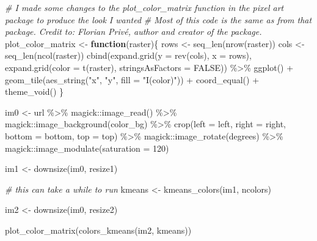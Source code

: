 \documentclass[
  openany]{book}
\newenvironment{Shaded}{\begin{snugshade}}{\end{snugshade}}
\newcommand{\AttributeTok}[1]{\textcolor[rgb]{0.77,0.63,0.00}{#1}}
\newcommand{\CommentTok}[1]{\textcolor[rgb]{0.56,0.35,0.01}{\textit{#1}}}
\newcommand{\ConstantTok}[1]{\textcolor[rgb]{0.00,0.00,0.00}{#1}}
\newcommand{\ControlFlowTok}[1]{\textcolor[rgb]{0.13,0.29,0.53}{\textbf{#1}}}
\newcommand{\DecValTok}[1]{\textcolor[rgb]{0.00,0.00,0.81}{#1}}
\newcommand{\FunctionTok}[1]{\textcolor[rgb]{0.00,0.00,0.00}{#1}}
\newcommand{\NormalTok}[1]{#1}
\newcommand{\OtherTok}[1]{\textcolor[rgb]{0.56,0.35,0.01}{#1}}
\newcommand{\SpecialCharTok}[1]{\textcolor[rgb]{0.00,0.00,0.00}{#1}}
\newcommand{\StringTok}[1]{\textcolor[rgb]{0.31,0.60,0.02}{#1}}
\begin{document}
\begin{Shaded}
\begin{Highlighting}[]
\CommentTok{\# I made some changes to the plot\_color\_matrix function in the pixel art package to produce the look I wanted}
\CommentTok{\# Most of this code is the same as from that package. Credit to: Florian Privé, author and creator of the package. }
\NormalTok{plot\_color\_matrix }\OtherTok{\textless{}{-}} \ControlFlowTok{function}\NormalTok{(raster)\{}
\NormalTok{    rows }\OtherTok{\textless{}{-}} \FunctionTok{seq\_len}\NormalTok{(}\FunctionTok{nrow}\NormalTok{(raster))}
\NormalTok{    cols }\OtherTok{\textless{}{-}} \FunctionTok{seq\_len}\NormalTok{(}\FunctionTok{ncol}\NormalTok{(raster))}
    \FunctionTok{cbind}\NormalTok{(}\FunctionTok{expand.grid}\NormalTok{(}\AttributeTok{y =} \FunctionTok{rev}\NormalTok{(cols), }\AttributeTok{x =}\NormalTok{ rows), }\FunctionTok{expand.grid}\NormalTok{(}\AttributeTok{color =} \FunctionTok{t}\NormalTok{(raster), }
        \AttributeTok{stringsAsFactors =} \ConstantTok{FALSE}\NormalTok{)) }\SpecialCharTok{\%\textgreater{}\%} \FunctionTok{ggplot}\NormalTok{() }\SpecialCharTok{+} \FunctionTok{geom\_tile}\NormalTok{(}\FunctionTok{aes\_string}\NormalTok{(}\StringTok{"x"}\NormalTok{, }
        \StringTok{"y"}\NormalTok{, }\AttributeTok{fill =} \StringTok{"I(color)"}\NormalTok{)) }\SpecialCharTok{+} \FunctionTok{coord\_equal}\NormalTok{() }\SpecialCharTok{+} \FunctionTok{theme\_void}\NormalTok{()}
\NormalTok{\}}

\NormalTok{im0 }\OtherTok{\textless{}{-}}\NormalTok{ url }\SpecialCharTok{\%\textgreater{}\%}\NormalTok{ magick}\SpecialCharTok{::}\FunctionTok{image\_read}\NormalTok{() }\SpecialCharTok{\%\textgreater{}\%}\NormalTok{ magick}\SpecialCharTok{::}\FunctionTok{image\_background}\NormalTok{(color\_bg) }\SpecialCharTok{\%\textgreater{}\%} 
        \FunctionTok{crop}\NormalTok{(}\AttributeTok{left =}\NormalTok{ left, }\AttributeTok{right =}\NormalTok{ right, }\AttributeTok{bottom =}\NormalTok{ bottom, }\AttributeTok{top =}\NormalTok{ top) }\SpecialCharTok{\%\textgreater{}\%} 
\NormalTok{        magick}\SpecialCharTok{::}\FunctionTok{image\_rotate}\NormalTok{(degrees) }\SpecialCharTok{\%\textgreater{}\%}\NormalTok{ magick}\SpecialCharTok{::}\FunctionTok{image\_modulate}\NormalTok{(}\AttributeTok{saturation =} \DecValTok{120}\NormalTok{)}

\NormalTok{im1 }\OtherTok{\textless{}{-}} \FunctionTok{downsize}\NormalTok{(im0, resize1)}

\CommentTok{\# this can take a while to run}
\NormalTok{kmeans }\OtherTok{\textless{}{-}} \FunctionTok{kmeans\_colors}\NormalTok{(im1, ncolors)}

\NormalTok{im2 }\OtherTok{\textless{}{-}} \FunctionTok{downsize}\NormalTok{(im0, resize2)}

\FunctionTok{plot\_color\_matrix}\NormalTok{(}\FunctionTok{colors\_kmeans}\NormalTok{(im2, kmeans))}
\end{Highlighting}
\end{Shaded}
\end{document}
